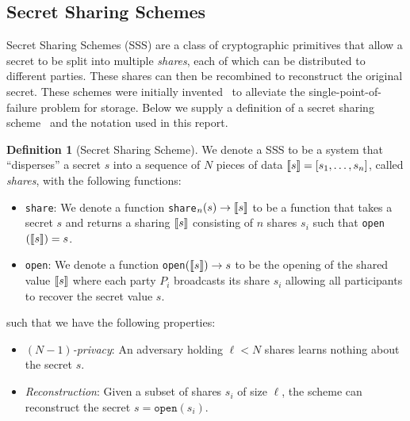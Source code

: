 \documentclass[11pt]{report}
\theoremstyle{definition}
\newtheorem{definition}{Definition}[section]
\theoremstyle{plain}
\begin{document}


\subsection{Secret Sharing Schemes}

Secret Sharing Schemes (SSS) are a class of cryptographic primitives that allow a secret to be split into multiple \textit{shares}, each of which can be distributed to different parties. These shares can then be recombined to reconstruct the original secret. These schemes were initially invented~\cite{shamir1979share} to alleviate the single-point-of-failure problem for storage. Below we supply a definition of a secret sharing scheme~\cite{cramer2015secure} and the notation used in this report.

\begin{definition}[Secret Sharing Scheme]\label{def:ss-share}
  We denote a SSS to be a system that ``disperses'' a secret $s$ into a sequence of $N$ pieces of data $\llbracket s \rrbracket = [s_1, \dots, s_n]$, called \textit{shares}, with the following functions:
  \begin{itemize}
    \item \texttt{share}: We denote a function \texttt{share}$_n(s) \rightarrow \llbracket s \rrbracket$ to be a function that takes a secret $s$ and returns a sharing $\llbracket s \rrbracket$ consisting of $n$ shares $s_i$ such that \texttt{open}$(\llbracket s \rrbracket) = s$.
    \item \texttt{open}: We denote a function \texttt{open}$(\llbracket s \rrbracket) \rightarrow s$ to be the opening of the shared value $\llbracket s \rrbracket$ where each party $P_i$ broadcasts its share $s_i$ allowing all participants to recover the secret value $s$.
  \end{itemize}
  such that we have the following properties:
  \begin{itemize}[parsep=0pt, itemsep=0pt]
    \item \textit{$(N-1)$-privacy}: An adversary holding $\ell < N$ shares learns nothing about the secret $s$.
    \item \textit{Reconstruction}: Given a subset of shares $s_i$ of size $\ell$, the scheme can reconstruct the secret $s = \texttt{open}(s_i)$.
  \end{itemize}
\end{definition}
\end{document}
